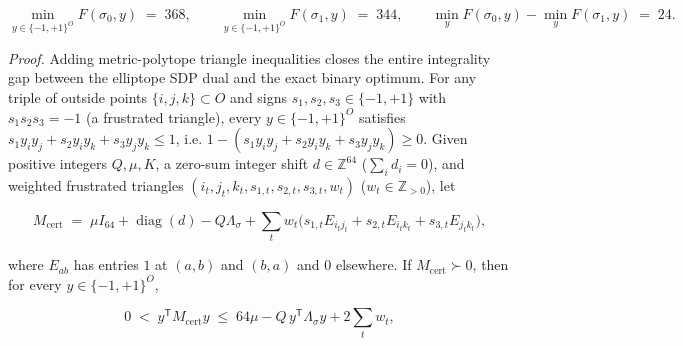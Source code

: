 \documentclass[11pt,a4paper]{article}
\newcommand{\gt}{>}
\begin{document}
\[\min_{y \in \{-1, +1\}^O} F(\sigma_0, y) \;=\; 368, \qquad
\min_{y \in \{-1, +1\}^O} F(\sigma_1, y) \;=\; 344, \qquad
\min_y F(\sigma_0, y) - \min_y F(\sigma_1, y) \;=\; 24 .
\tag{C13}\]

\emph{Proof.} Adding metric-polytope triangle inequalities closes the entire integrality gap between the
elliptope SDP dual and the exact binary optimum. For any triple of outside points \(\{i, j, k\} \subset O\)
and signs \(s_1, s_2, s_3 \in \{-1, +1\}\) with \(s_1 s_2 s_3 = -1\) (a frustrated triangle), every
\(y \in \{-1, +1\}^O\) satisfies \(s_1 y_i y_j + s_2 y_i y_k + s_3 y_j y_k \le 1\), i.e.
\(1 - (s_1 y_i y_j + s_2 y_i y_k + s_3 y_j y_k) \ge 0\). Given positive integers \(Q, \mu, K\), a zero-sum
integer shift \(d \in \mathbb{Z}^{64}\) (\(\sum_i d_i = 0\)), and weighted frustrated triangles
\((i_t, j_t, k_t, s_{1,t}, s_{2,t}, s_{3,t}, w_t)\) (\(w_t \in \mathbb{Z}_{ \gt 0}\)), let

\[M_{\mathrm{cert}} \;=\; \mu I_{64} + \operatorname{diag}(d) - Q \Lambda_\sigma +
  \sum_t w_t \big(s_{1,t} E_{i_t j_t} + s_{2,t} E_{i_t k_t} + s_{3,t} E_{j_t k_t}\big),\]

where \(E_{ab}\) has entries \(1\) at \((a, b)\) and \((b, a)\) and \(0\) elsewhere. If \(M_{\mathrm{cert}} \succ 0\),
then for every \(y \in \{-1, +1\}^O\),

\[0 \;<\; y^{\mathsf T} M_{\mathrm{cert}} y \;\le\;
  64\mu - Q\,y^{\mathsf T} \Lambda_\sigma y + 2 \sum_t w_t ,\]
\end{document}
